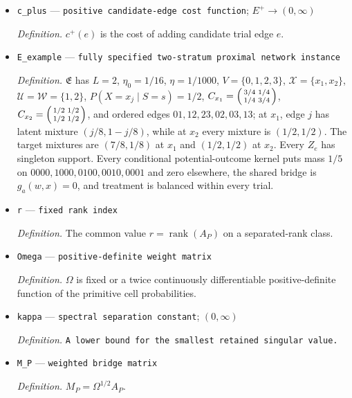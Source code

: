 \documentclass{article}
\begin{document}
\begin{itemize}
  \item \texttt{c\_\allowbreak{}plus} --- \texttt{positive candidate-\allowbreak{}edge cost function}; \(E^+\to(0,\infty)\)
  \par\smallskip\noindent\emph{Definition.} \(c^+(e)\) is the cost of adding candidate trial edge \(e\).
  \item \texttt{E\_\allowbreak{}example} --- \texttt{fully specified two-\allowbreak{}stratum proximal network instance}
  \par\smallskip\noindent\emph{Definition.} \(\mathfrak E\) has \(L=2\), \(\eta_0=1/16\), \(\eta=1/1000\), \(V=\{0,1,2,3\}\), \(\mathcal X=\{x_1,x_2\}\), \(\mathcal U=\mathcal W=\{1,2\}\), \(P(X=x_j\mid S=s)=1/2\), \(C_{x_1}=\begin{psmallmatrix}3/4&1/4\\1/4&3/4\end{psmallmatrix}\), \(C_{x_2}=\begin{psmallmatrix}1/2&1/2\\1/2&1/2\end{psmallmatrix}\), and ordered edges \(01,12,23,02,03,13\); at \(x_1\), edge \(j\) has latent mixture \((j/8,1-j/8)\), while at \(x_2\) every mixture is \((1/2,1/2)\). The target mixtures are \((7/8,1/8)\) at \(x_1\) and \((1/2,1/2)\) at \(x_2\). Every \(Z_e\) has singleton support. Every conditional potential-outcome kernel puts mass \(1/5\) on \(0000,1000,0100,0010,0001\) and zero elsewhere, the shared bridge is \(g_a(w,x)=0\), and treatment is balanced within every trial.
  \item \texttt{r} --- \texttt{fixed rank index}
  \par\smallskip\noindent\emph{Definition.} The common value \(r=\operatorname{rank}(A_P)\) on a separated-rank class.
  \item \texttt{Omega} --- \texttt{positive-\allowbreak{}definite weight matrix}
  \par\smallskip\noindent\emph{Definition.} \(\Omega\) is fixed or a twice continuously differentiable positive-definite function of the primitive cell probabilities.
  \item \texttt{kappa} --- \texttt{spectral separation constant}; \((0,\infty)\)
  \par\smallskip\noindent\emph{Definition.} \texttt{A lower bound for the smallest retained singular value.}
  \item \texttt{M\_\allowbreak{}P} --- \texttt{weighted bridge matrix}
  \par\smallskip\noindent\emph{Definition.} \(M_P=\Omega^{1/2}A_P\).

\end{itemize}
\end{document}
